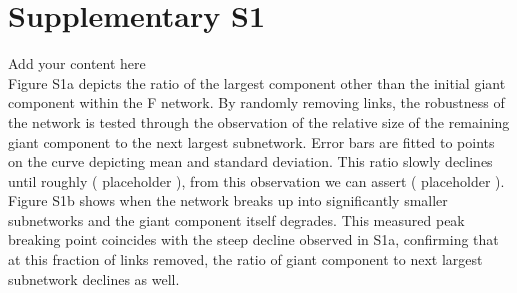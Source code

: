 \documentclass[10pt]{article}         %
\begin{document}
\newpage
\section{Supplementary S1}
Add your content here\\
Figure S1a depicts the ratio of the largest component other than the initial giant component within the F network. By randomly removing links, the robustness of the network is tested through the observation of the relative size of the remaining giant component to the next largest subnetwork. Error bars are fitted to points on the curve depicting mean and standard deviation. This ratio slowly declines until roughly ( placeholder ), from this observation we can assert ( placeholder ). Figure S1b shows when the network breaks up into significantly smaller subnetworks and the giant component itself degrades. This measured peak breaking point coincides with the steep decline observed in S1a, confirming that at this fraction of links removed, the ratio of giant component to next largest subnetwork declines as well. 

\newpage
\end{document}
